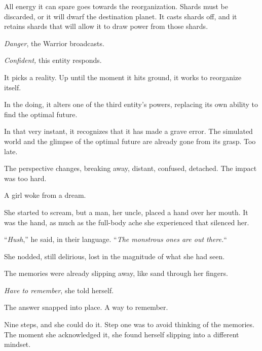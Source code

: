 All energy it can spare goes towards the reorganization.  Shards must be discarded, or it will dwarf the destination planet.  It casts shards off, and it retains shards that will allow it to draw power from those shards.



\emph{Danger}, the Warrior broadcasts.



\emph{Confident, }this entity responds.



It picks a reality.  Up until the moment it hits ground, it works to reorganize itself.



In the doing, it alters one of the third entity's powers, replacing its own ability to find the optimal future.



In that very instant, it recognizes that it has made a grave error.  The simulated world and the glimpse of the optimal future are already gone from its grasp.  Too late.



The perspective changes, breaking away, distant, confused, detached.  The impact was too hard.



\blacksquare



A girl woke from a dream.



She started to scream, but a man, her uncle, placed a hand over her mouth.  It was the hand, as much as the full-body ache she experienced that silenced her.



``\emph{Hush},'' he said, in their language.  ``\emph{The monstrous ones are out there.}``



She nodded, still delirious, lost in the magnitude of what she had seen.



The memories were already slipping away, like sand through her fingers.



\emph{Have to remember}, she told herself.



The answer snapped into place.  A way to remember.



Nine steps, and she could do it.  Step one was to avoid thinking of the memories.  The moment she acknowledged it, she found herself slipping into a different mindset.



